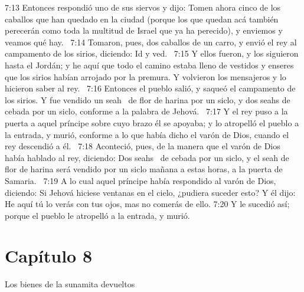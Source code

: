 7:13 Entonces respondió uno de sus siervos y dijo: Tomen ahora cinco de los caballos que han quedado en la ciudad (porque los que quedan acá también perecerán como toda la multitud de Israel que ya ha perecido), y enviemos y veamos qué hay.  
7:14 Tomaron, pues, dos caballos de un carro, y envió el rey al campamento de los sirios, diciendo: Id y ved.  
7:15 Y ellos fueron, y los siguieron hasta el Jordán; y he aquí que todo el camino estaba lleno de vestidos y enseres que los sirios habían arrojado por la premura. Y volvieron los mensajeros y lo hicieron saber al rey.  
7:16 Entonces el pueblo salió, y saqueó el campamento de los sirios. Y fue vendido un seah  de flor de harina por un siclo, y dos seahs de cebada por un siclo, conforme a la palabra de Jehová.  
7:17 Y el rey puso a la puerta a aquel príncipe sobre cuyo brazo él se apoyaba; y lo atropelló el pueblo a la entrada, y murió, conforme a lo que había dicho el varón de Dios, cuando el rey descendió a él.  
7:18 Aconteció, pues, de la manera que el varón de Dios había hablado al rey, diciendo: Dos seahs  de cebada por un siclo, y el seah de flor de harina será vendido por un siclo mañana a estas horas, a la puerta de Samaria.  
7:19 A lo cual aquel príncipe había respondido al varón de Dios, diciendo: Si Jehová hiciese ventanas en el cielo, ¿pudiera suceder esto? Y él dijo: He aquí tú lo verás con tus ojos, mas no comerás de ello. 
7:20 Y le sucedió así; porque el pueblo le atropelló a la entrada, y murió.  
\section*{Capítulo 8 }
Los bienes de la sunamita devueltos  

